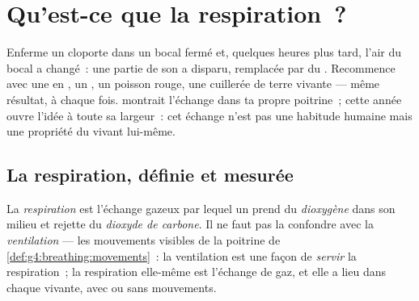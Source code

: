 \chapter{Qu'est-ce que la respiration~?}\label{ch:g7:what-is-respiration}

Enferme un cloporte dans un bocal fermé et, quelques heures plus
tard, l'air du bocal a changé~: une partie de son  a
disparu, remplacée par du . Recommence avec une
 en , un , un poisson rouge, une
cuillerée de terre vivante --- même résultat, à chaque fois.
 montrait l'échange dans ta propre
poitrine~; cette année ouvre l'idée à toute sa largeur~: cet échange
n'est pas une habitude humaine mais une propriété du vivant
lui-même.

\section{La respiration, définie et mesurée}

\begin{definition}[Respiration]\label{def:g7:what-is-respiration:respiration}
La \emph{respiration} est l'échange gazeux par
lequel un  prend du \emph{dioxygène}
dans son milieu et rejette du \emph{dioxyde de carbone}. Il ne faut pas la confondre avec la
\emph{ventilation} --- les mouvements visibles de
la poitrine de \cref{def:g4:breathing:movements}~: la ventilation
est une façon de \emph{servir} la respiration~; la respiration
elle-même est l'échange de gaz, et elle a lieu dans chaque 
vivante, avec ou sans mouvements.
\end{definition}

